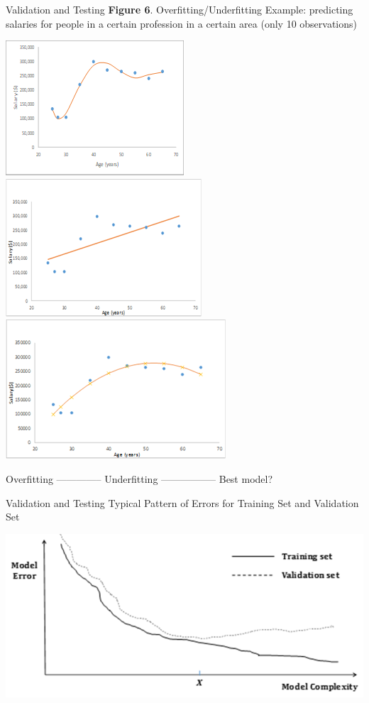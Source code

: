 \documentclass[11pt]{beamer}
\begin{document}
\begin{frame}{Validation and Testing}
\textbf{Figure 6}. Overfitting/Underfitting Example: predicting salaries for people in a certain profession in a certain area (only 10 observations)
	\begin{center}
	\includegraphics[scale=.5]{../05-pictures/lesson-2-2_pic_10.png}  \hfill
	\includegraphics[scale=.5]{../05-pictures/lesson-2-2_pic_11.png}  \hfill
	\includegraphics[scale=.5]{../05-pictures/lesson-2-2_pic_12.png}
	\end{center}
	Overfitting -------------- Underfitting	 ----------------- Best model?
\end{frame}
\begin{frame}{Validation and Testing}
Typical Pattern of Errors for Training Set and Validation Set	
	\begin{center}
	\includegraphics[scale=.6]{../05-pictures/lesson-2-2_pic_13.png}
	\end{center}
\end{frame}
\end{document}
